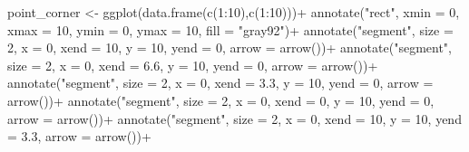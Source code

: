 \documentclass[
  letterpaper,
]{book}
\newenvironment{Shaded}{\begin{snugshade}}{\end{snugshade}}
\newcommand{\AttributeTok}[1]{\textcolor[rgb]{0.40,0.45,0.13}{#1}}
\newcommand{\DecValTok}[1]{\textcolor[rgb]{0.68,0.00,0.00}{#1}}
\newcommand{\FloatTok}[1]{\textcolor[rgb]{0.68,0.00,0.00}{#1}}
\newcommand{\FunctionTok}[1]{\textcolor[rgb]{0.28,0.35,0.67}{#1}}
\newcommand{\NormalTok}[1]{\textcolor[rgb]{0.00,0.23,0.31}{#1}}
\newcommand{\OtherTok}[1]{\textcolor[rgb]{0.00,0.23,0.31}{#1}}
\newcommand{\SpecialCharTok}[1]{\textcolor[rgb]{0.37,0.37,0.37}{#1}}
\newcommand{\StringTok}[1]{\textcolor[rgb]{0.13,0.47,0.30}{#1}}
\begin{document}
\begin{Shaded}
\begin{Highlighting}[]
\NormalTok{point\_corner }\OtherTok{\textless{}{-}} \FunctionTok{ggplot}\NormalTok{(}\FunctionTok{data.frame}\NormalTok{(}\FunctionTok{c}\NormalTok{(}\DecValTok{1}\SpecialCharTok{:}\DecValTok{10}\NormalTok{),}\FunctionTok{c}\NormalTok{(}\DecValTok{1}\SpecialCharTok{:}\DecValTok{10}\NormalTok{)))}\SpecialCharTok{+}
  \FunctionTok{annotate}\NormalTok{(}\StringTok{"rect"}\NormalTok{, }\AttributeTok{xmin =} \DecValTok{0}\NormalTok{, }\AttributeTok{xmax =} \DecValTok{10}\NormalTok{, }\AttributeTok{ymin =} \DecValTok{0}\NormalTok{, }\AttributeTok{ymax =} \DecValTok{10}\NormalTok{, }\AttributeTok{fill =} \StringTok{"gray92"}\NormalTok{)}\SpecialCharTok{+}
  \FunctionTok{annotate}\NormalTok{(}\StringTok{"segment"}\NormalTok{, }\AttributeTok{size =} \DecValTok{2}\NormalTok{, }\AttributeTok{x =} \DecValTok{0}\NormalTok{, }\AttributeTok{xend =} \DecValTok{10}\NormalTok{, }\AttributeTok{y =} \DecValTok{10}\NormalTok{, }\AttributeTok{yend =} \DecValTok{0}\NormalTok{, }\AttributeTok{arrow =} \FunctionTok{arrow}\NormalTok{())}\SpecialCharTok{+}
  \FunctionTok{annotate}\NormalTok{(}\StringTok{"segment"}\NormalTok{, }\AttributeTok{size =} \DecValTok{2}\NormalTok{, }\AttributeTok{x =} \DecValTok{0}\NormalTok{, }\AttributeTok{xend =} \FloatTok{6.6}\NormalTok{, }\AttributeTok{y =} \DecValTok{10}\NormalTok{, }\AttributeTok{yend =} \DecValTok{0}\NormalTok{, }\AttributeTok{arrow =} \FunctionTok{arrow}\NormalTok{())}\SpecialCharTok{+}
  \FunctionTok{annotate}\NormalTok{(}\StringTok{"segment"}\NormalTok{, }\AttributeTok{size =} \DecValTok{2}\NormalTok{, }\AttributeTok{x =} \DecValTok{0}\NormalTok{, }\AttributeTok{xend =} \FloatTok{3.3}\NormalTok{, }\AttributeTok{y =} \DecValTok{10}\NormalTok{, }\AttributeTok{yend =} \DecValTok{0}\NormalTok{, }\AttributeTok{arrow =} \FunctionTok{arrow}\NormalTok{())}\SpecialCharTok{+}
  \FunctionTok{annotate}\NormalTok{(}\StringTok{"segment"}\NormalTok{, }\AttributeTok{size =} \DecValTok{2}\NormalTok{, }\AttributeTok{x =} \DecValTok{0}\NormalTok{, }\AttributeTok{xend =} \DecValTok{0}\NormalTok{, }\AttributeTok{y =} \DecValTok{10}\NormalTok{, }\AttributeTok{yend =} \DecValTok{0}\NormalTok{, }\AttributeTok{arrow =} \FunctionTok{arrow}\NormalTok{())}\SpecialCharTok{+}
  \FunctionTok{annotate}\NormalTok{(}\StringTok{"segment"}\NormalTok{, }\AttributeTok{size =} \DecValTok{2}\NormalTok{, }\AttributeTok{x =} \DecValTok{0}\NormalTok{, }\AttributeTok{xend =} \DecValTok{10}\NormalTok{, }\AttributeTok{y =} \DecValTok{10}\NormalTok{, }\AttributeTok{yend =} \FloatTok{3.3}\NormalTok{, }\AttributeTok{arrow =} \FunctionTok{arrow}\NormalTok{())}\SpecialCharTok{+}

\end{Highlighting}
\end{Shaded}
\end{document}
